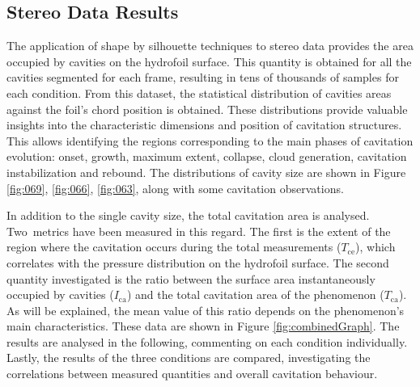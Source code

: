 \subsection{Stereo Data Results}
\label{SD_rresults}
The application of shape by silhouette techniques to stereo data provides the area occupied by cavities on the hydrofoil surface. This quantity is obtained for all the cavities segmented for each frame, resulting in tens of thousands of samples for each condition. From this dataset, the statistical distribution of cavities areas against the foil's chord position is obtained.
These distributions provide valuable insights into the characteristic dimensions and position of cavitation structures. This allows identifying the regions corresponding to the main phases of cavitation evolution: onset, growth, maximum extent, collapse, cloud generation, cavitation instabilization and rebound. 
The distributions of cavity size are shown in Figure \ref{fig:069}, \ref{fig:066}, \ref{fig:063}, along with some cavitation observations.

In addition to the single cavity size, the total cavitation area is analysed. Two metrics have been measured in this regard. The first is the extent of the region where the cavitation occurs during the total measurements ($T_{\text{ce}}$), which correlates with the pressure distribution on the hydrofoil surface. The second quantity investigated is the ratio between the surface area instantaneously occupied by cavities ($I_{\text{ca}}$) and the total cavitation area of the phenomenon ($T_{\text{ca}}$). 
As will be explained, the mean value of this ratio depends on the phenomenon's main characteristics.
These data are shown in Figure \ref{fig:combinedGraph}.
The results are analysed in the following, commenting on each condition individually. Lastly, the results of the three conditions are compared, investigating the correlations between measured quantities and overall cavitation behaviour.

